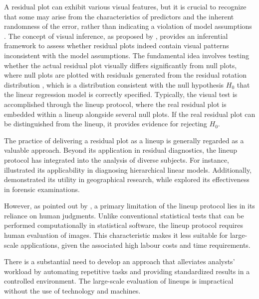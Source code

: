 \documentclass[]{interact}
\theoremstyle{plain}%
\theoremstyle{definition}
\theoremstyle{remark}
\begin{document}
A residual plot can exhibit various visual features, but it is crucial
to recognize that some may arise from the characteristics of predictors
and the inherent randomness of the error, rather than indicating a
violation of model assumptions \citep{li2023plot}. The concept of visual
inference, as proposed by \citet{buja2009statistical}, provides an
inferential framework to assess whether residual plots indeed contain
visual patterns inconsistent with the model assumptions. The fundamental
idea involves testing whether the actual residual plot visually differs
significantly from null plots, where null plots are plotted with
residuals generated from the residual rotation distribution
\citep{langsrud2005rotation}, which is a distribution consistent with
the null hypothesis \(H_0\) that the linear regression model is
correctly specified. Typically, the visual test is accomplished through
the lineup protocol, where the real residual plot is embedded within a
lineup alongside several null plots. If the real residual plot can be
distinguished from the lineup, it provides evidence for rejecting
\(H_0\).

The practice of delivering a residual plot as a lineup is generally
regarded as a valuable approach. Beyond its application in residual
diagnostics, the lineup protocol has integrated into the analysis of
diverse subjects. For instance,
\cite{loy2013diagnostic, loy2014hlmdiag, loy2015you} illustrated its
applicability in diagnosing hierarchical linear models. Additionally,
\citet{widen2016graphical} demonstrated its utility in geographical
research, while \citet{krishnan2021hierarchical} explored its
effectiveness in forensic examinations.

However, as pointed out by \citet{li2023plot}, a primary limitation of
the lineup protocol lies in its reliance on human judgments. Unlike
conventional statistical tests that can be performed computationally in
statistical software, the lineup protocol requires human evaluation of
images. This characteristic makes it less suitable for large-scale
applications, given the associated high labour costs and time
requirements.

There is a substantial need to develop an approach that alleviates
analysts' workload by automating repetitive tasks and providing
standardized results in a controlled environment. The large-scale
evaluation of lineups is impractical without the use of technology and
machines.
\end{document}
